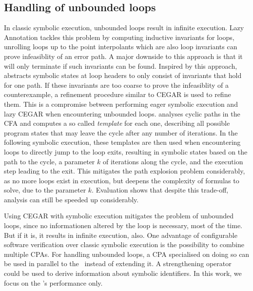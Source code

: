 \subsection*{Handling of unbounded loops}
In classic symbolic execution, unbounded loops result in infinite execution.
Lazy Annotation \cite{McMillan2010} tackles this problem by computing inductive invariants for loops, unrolling loops up to the point interpolants which are also loop invariants can prove infeasiblity of an error path.
A major downside to this approach is that it will only terminate if such invariants can be found.
Inspired by this approach, \cite{Jaffar2012} abstracts symbolic states at loop headers to only consist of invariants that hold for one path.
If these invariants are too coarse to prove the infeasiblity of a counterexample, a refinement procedure similar to CEGAR is used to refine them.
This is a compromise between performing eager symbolic execution and lazy CEGAR when encountering unbounded loops.
\cite{Slaby2013} analyses cyclic paths in the CFA and computes a so called \emph{template} for each one,
describing all possible program states that may leave the cycle after any number of iterations.
In the following symbolic execution, these templates are then used when encountering loops to directly jump to the loop exits, resulting in symbolic states based on the path to the cycle, a parameter $k$ of iterations along the cycle, and the execution step leading to the exit.
This mitigates the path explosion problem considerably, as no more loops exist in execution, but deepens the complexity of formulas to solve, due to the parameter $k$.
Evaluation shows that despite this trade-off, analysis can still be speeded up considerably.

Using CEGAR with symbolic execution mitigates the problem of unbounded loops, since no informationen altered by the loop is necessary, most of the time.
But if it is, it results in infinite execution, also.
One advantage of configurable software verification over classic symbolic execution is the possibility to combine multiple CPAs.
For handling unbounded loops, a CPA specialised on doing so can be used in parallel to the \symbolicExecutionCPA\ instead of extending it.
A strengthening operator could be used to derive information about symbolic identifiers.
In this work, we focus on the \symbolicExecutionCPA's performance only.

